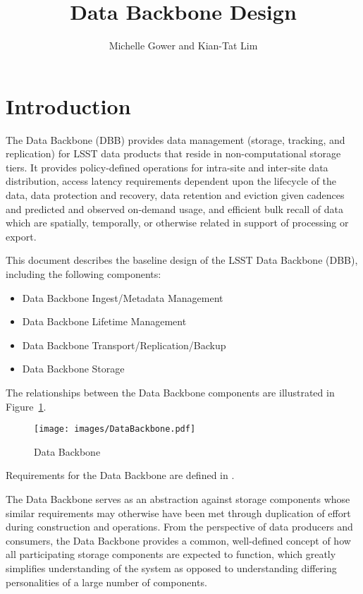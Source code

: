 \documentclass[DM,authoryear,toc]{lsstdoc}
\title{Data Backbone Design}
\author{%
Michelle Gower and
Kian-Tat Lim
}
\date{\vcsDate}
\begin{document}
\maketitle


\section{Introduction}\label{introduction}

The Data Backbone (DBB) provides data management (storage, tracking, and
replication) for LSST data products that reside in non-computational storage
tiers.  It provides policy-defined operations for intra-site and inter-site
data distribution, access latency requirements dependent upon the lifecycle of
the data, data protection and recovery, data retention and eviction given
cadences and predicted and observed on-demand usage, and efficient bulk recall
of data which are spatially, temporally, or otherwise related in support of
processing or export.

This document describes the baseline design of the LSST Data Backbone (DBB),
including the following components:

\begin{itemize}
	\item Data Backbone Ingest/Metadata Management
	\item Data Backbone Lifetime Management
	\item Data Backbone Transport/Replication/Backup
	\item Data Backbone Storage
\end{itemize}

The relationships between the Data Backbone components are illustrated
in Figure~\ref{fig:dbb}.

\begin{figure}
\centering
\texttt{[image: images/DataBackbone.pdf]}
\caption{Data Backbone}
\label{fig:dbb}
\end{figure}

Requirements for the Data Backbone are defined in .

The Data Backbone serves as an abstraction against storage components whose
similar requirements may otherwise have been met through duplication of effort
during construction and operations. From the perspective of data producers and
consumers, the Data Backbone provides a common, well-defined concept of how all
participating storage components are expected to function, which greatly
simplifies understanding of the system as opposed to understanding differing
personalities of a large number of components.
\end{document}
